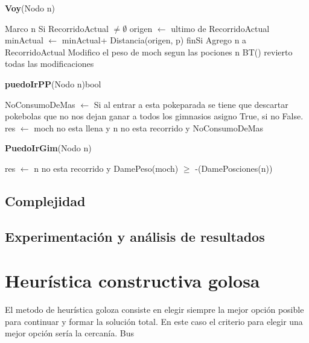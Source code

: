 \documentclass[spanish,12pt]{article}
\begin{document}
\begin{algorithm}[H]{\textbf{Voy}(Nodo n)}
	\begin{algorithmic}[1]
		\State Marco n
		\State Si RecorridoActual $ \not= \emptyset$
		\State \quad origen $\gets$ ultimo de RecorridoActual
		\State \quad minActual $\gets$ minActual+ Distancia(origen, p)
		\State finSi
		\State Agrego n a RecorridoActual
		\State Modifico el peso de moch segun las pociones n
		\State BT()
		\State revierto todas las modificaciones
	\end{algorithmic}
\end{algorithm}

\begin{algorithm}[H]{\textbf{puedoIrPP}(Nodo n){bool}}
	\begin{algorithmic}[1]
	\State NoConsumoDeMas $\gets$ Si al entrar a esta pokeparada se tiene que descartar pokebolas que no nos dejan ganar a todos los gimnasios asigno True, si no False.
	\State  res $\gets$  moch no esta llena y n no esta recorrido y NoConsumoDeMas
	\end{algorithmic}
\end{algorithm}

\begin{algorithm}[H]{\textbf{PuedoIrGim}(Nodo n)}
	\begin{algorithmic}[1]
		\state res $\gets$  n no esta recorrido y DamePeso(moch) $\geq$ -(DamePosciones(n))
	\end{algorithmic}
\end{algorithm}


\subsection{Complejidad}

\subsection{Experimentación y análisis de resultados}



\section{Heurística constructiva golosa}

El metodo de heurística goloza consiste en elegir siempre la mejor opción posible para continuar y formar la solución total. En este caso el criterio para elegir una mejor opción sería la cercanía. Bus
\end{document}
